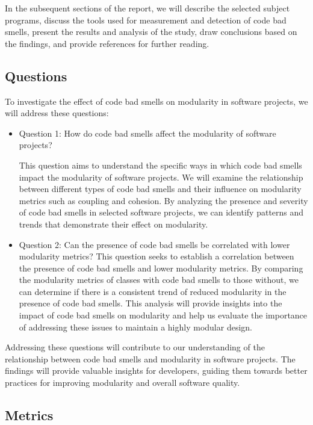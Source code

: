 \documentclass[conference]{IEEEtran}
\begin{document}
	In the subsequent sections of the report, we will describe the selected subject programs, discuss the tools used for measurement and detection of code bad smells, present the results and analysis of the study, draw conclusions based on the findings, and provide references for further reading.
	\subsection{Questions}
	To investigate the effect of code bad smells on modularity in software projects, we will address these questions:
	\begin{itemize}
		\item Question 1: How do code bad smells affect the modularity of software projects?
		
		This question aims to understand the specific ways in which code bad smells impact the modularity of software projects. We will examine the relationship between different types of code bad smells and their influence on modularity metrics such as coupling and cohesion. By analyzing the presence and severity of code bad smells in selected software projects, we can identify patterns and trends that demonstrate their effect on modularity.
		
		\item Question 2: Can the presence of code bad smells be correlated with lower modularity metrics?
		This question seeks to establish a correlation between the presence of code bad smells and lower modularity metrics. By comparing the modularity metrics of classes with code bad smells to those without, we can determine if there is a consistent trend of reduced modularity in the presence of code bad smells. This analysis will provide insights into the impact of code bad smells on modularity and help us evaluate the importance of addressing these issues to maintain a highly modular design.
	\end{itemize}

		Addressing these questions will contribute to our understanding of the relationship between code bad smells and modularity in software projects. The findings will provide valuable insights for developers, guiding them towards better practices for improving modularity and overall software quality.
	
	\subsection{Metrics}
	
\end{document}
